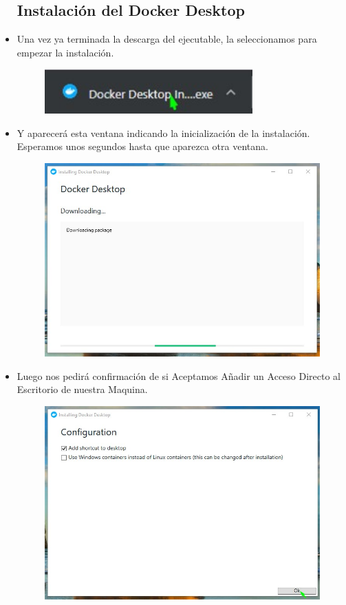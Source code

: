 \begin{itemize}
		\subsection{Instalación del Docker Desktop}
			\item Una vez ya terminada la descarga del ejecutable, la seleccionamos para empezar la instalación.
				\begin{figure}[htb]
					\begin{center}
						\includegraphics[width=8cm]{./Imagenes/EjecutarEjecutableApp}
					\end{center}
				\end{figure}
			\item Y aparecerá esta ventana indicando la inicialización de la instalación. Esperamos unos segundos hasta que aparezca otra ventana.
				\begin{figure}[htb]
					\begin{center}
						\includegraphics[width=11cm]{./Imagenes/Instalacion01}
					\end{center}
				\end{figure}
				\vspace{10cm}
			\item Luego nos pedirá confirmación de si Aceptamos Añadir un Acceso Directo al Escritorio de nuestra Maquina.
				\begin{figure}[htb]
					\begin{center}
						\includegraphics[width=11cm]{./Imagenes/Instalacion02}

\end{center}
\end{figure}
\end{itemize}
